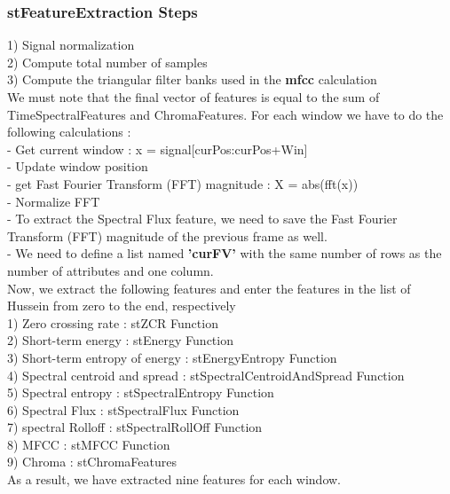 \documentclass[10pt]{article}
\begin{document}
\subsubsection{\textbf{\normalsize stFeatureExtraction Steps }}
1) Signal normalization\\
2) Compute total number of samples\\
3) Compute the triangular filter banks used in the \textbf{mfcc} calculation\\
We must note that the final vector of features is equal to the sum of TimeSpectralFeatures and ChromaFeatures. For each window we have to do the following calculations :\\
- Get current window : x = signal[curPos:curPos+Win]\\
- Update window position\\
- get Fast Fourier Transform (FFT) magnitude : X = abs(fft(x))  \\
- Normalize FFT\\
- To extract the Spectral Flux feature, we need to save the Fast Fourier Transform (FFT) magnitude of the previous frame as well.\\
- We need to define a list named \textbf{'curFV'} with the same number of rows as the number of attributes and one column.\\
Now, we extract the following features and enter the features in the list of Hussein from zero to the end, respectively\\
1) Zero crossing rate : stZCR Function\\
2) Short-term energy : stEnergy Function\\
3) Short-term entropy of energy : stEnergyEntropy Function\\
4) Spectral centroid and spread : stSpectralCentroidAndSpread Function\\
5) Spectral entropy : stSpectralEntropy Function\\
6) Spectral Flux : stSpectralFlux Function\\
7) spectral Rolloff : stSpectralRollOff Function\\
8) MFCC : stMFCC Function\\
9) Chroma : stChromaFeatures\\
As a result, we have extracted nine features for each window.\\
\end{document}
